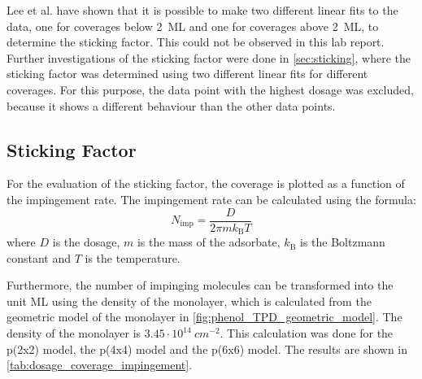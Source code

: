\documentclass[fontsize=11pt,reqno,a4paper,oneside]{scrartcl}
\begin{document}
Lee et al.\autocite{Lee2001} have shown that it is possible to make two different linear fits to the data, one for coverages below 2~\ac{ML} and one for coverages above 2~\ac{ML}, to determine the sticking factor. This could not be observed in this lab report. Further investigations of the sticking factor were done in \autoref{sec:sticking}, where the sticking factor was determined using two different linear fits for different coverages. For this purpose, the data point with the highest dosage was excluded, because it shows a different behaviour than the other data points.

\clearpage
\subsection{Sticking Factor}
\label{sec:sticking}

For the evaluation of the sticking factor, the coverage is plotted as a function of the impingement rate. The impingement rate can be calculated using the formula:
\begin{equation}
N_\mathrm{imp} = \frac{D}{2\pi m k_\mathrm{B} T}
\end{equation}
where $D$ is the dosage, $m$ is the mass of the adsorbate, $k_\mathrm{B}$ is the Boltzmann constant and $T$ is the temperature.

Furthermore, the number of impinging molecules can be transformed into the unit ML using the density of the monolayer, which is calculated from the geometric model of the monolayer in \autoref{fig:phenol_TPD_geometric_model}. The density of the monolayer is $3.45\cdot 10^{14}~\si{cm^{-2}}$. This calculation was done for the p(2x2) model, the p(4x4) model and the p(6x6) model. The results are shown in \autoref{tab:dosage_coverage_impingement}.
\end{document}
